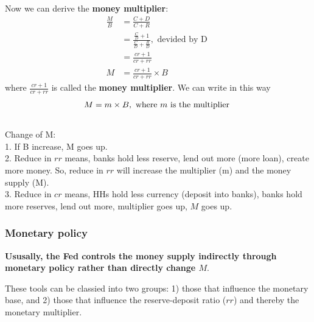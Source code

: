 \documentclass[12pt]{article}
\begin{document}
Now we can derive the {\textbf {money multiplier}}:
\begin{align*}
\frac{M}{B} &= \frac{C + D}{C + R}\\
 &= \frac{ \frac{C}{D} + 1}{ \frac{C}{D} + \frac{R}{D}}, \text{ devided by D }\\
 &= \frac{cr + 1}{cr + rr}\\
M &= \frac{cr + 1}{cr + rr} \times B
\end{align*}
where $ \frac{cr + 1}{cr + rr} $ is called the {\textbf {money multiplier}}. We can
write in this way
\begin{equation*}
M = m  \times B, \text{ where $ m $ is the multiplier }
\end{equation*}
\noindent{}\\

Change of M:\\
1. If B increase, M goes up.\\
2. Reduce in $ rr $ means, banks hold less reserve, lend out more (more loan),
create more money. So, reduce in $ rr $ will increase the multiplier (m) and the money 
supply (M).\\
3. Reduce in $ cr $ means, HHs hold less currency (deposit into banks), banks hold more
reserves, lend out more, multiplier goes up, $ M $ goes up.



\subsubsection{Monetary policy}

{\textbf {Ususally, the Fed controls the money supply indirectly through monetary
policy rather than directly change $ M $}}.

These tools can be classied into two groups: 1) those that influence the monetary base,
and 2) those that influence the reserve-deposit ratio ($ rr $) and thereby the 
monetary multiplier.\\
\end{document}
